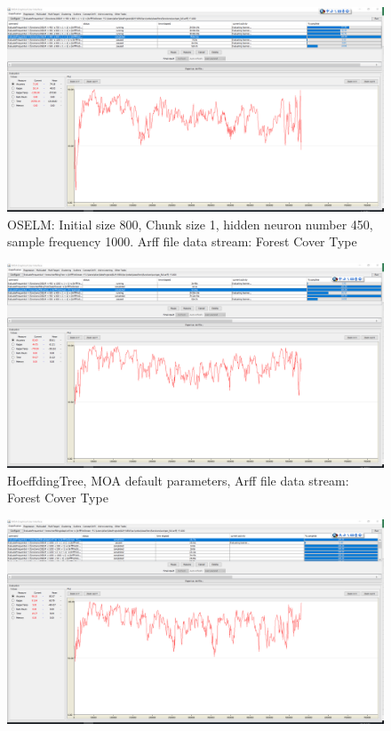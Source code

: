 \documentclass[a4paper, 14pt]{extarticle}
\begin{document}
\begin{landscape}
 \begin{figure}[H]
\centering

\includegraphics[width=1.35\textwidth]{11.png}
\caption{\label{fig:OSELM}OSELM: Initial size 800, Chunk size 1, hidden neuron number 450, sample frequency 1000. Arff file data stream: Forest Cover Type}
\end{figure}
 \begin{figure}[H]
\centering
\includegraphics[width=1.35\textwidth]{13.png}
\caption{\label{fig:HeoffdingTree} HoeffdingTree,  MOA default parameters, Arff file data stream: Forest Cover Type}
\end{figure}
 \begin{figure}[H]
\centering
\includegraphics[width=1.35\textwidth]{12.png}

\end{figure}
\end{landscape}
\end{document}
